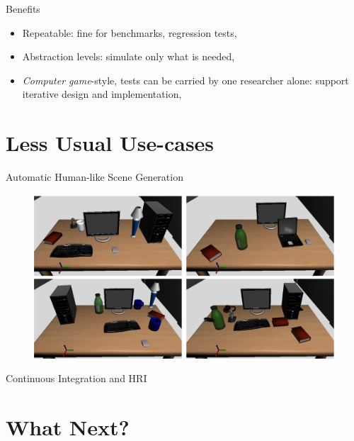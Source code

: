 \documentclass[compress]{beamer}
\begin{document}
\begin{frame}{Benefits}
    \begin{itemize}
        \item Repeatable: fine for benchmarks, regression tests,
        \item Abstraction levels: simulate only what is needed,
        \item \emph{Computer game}-style, tests can be carried by one researcher
            alone: support iterative design and implementation,

    \end{itemize}
\end{frame}


\section{Less Usual Use-cases}

\begin{frame}{Automatic Human-like Scene Generation}
    \begin{figure}
        \centering
        \includegraphics[width=\linewidth]{scenes}
    \end{figure}
\end{frame}


\begin{frame}{Continuous Integration and HRI}
    \begin{figure}
        \centering
    \end{figure}
\end{frame}


\section{What Next?}

\end{document}
